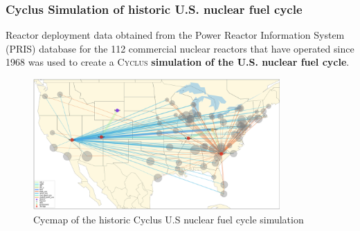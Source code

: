 \begin{frame}
    \frametitle{Cyclus Simulation of historic U.S. nuclear fuel cycle}
        Reactor deployment data obtained from the Power Reactor Information System (PRIS) database \cite{peterson_unf_2017} for the 112 commercial nuclear reactors that have operated since 1968 was used to create a \textsc{Cyclus} \textbf{simulation of the U.S. nuclear fuel cycle}. 

    \begin{figure}[htbp!]
      \begin{center}
        \includegraphics[height=5cm]{../figures/cycmap}
      \end{center}
            \caption{Cycmap of the historic Cyclus U.S nuclear fuel cycle simulation \cite{park_arfc/cycmap_2018}}
      \label{fig:cycmap}
    \end{figure}
  \end{frame}